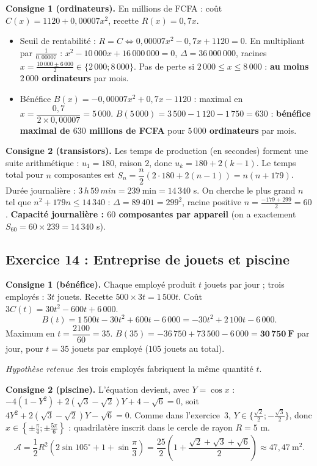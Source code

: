 \documentclass[11pt,a4paper]{article}
\newenvironment{hyp}{\par\medskip\noindent\textit{Hypoth\`ese retenue :}\quad}{\par\medskip}
\begin{document}
\textbf{Consigne 1 (ordinateurs).} En millions de FCFA : co\^ut $C(x)=1120+0{,}00007x^2$, recette $R(x)=0{,}7x$.
\begin{itemize}
  \item Seuil de rentabilit\'e : $R=C\iff0{,}00007x^2-0{,}7x+1120=0$. En multipliant par $\frac{1}{0{,}00007}$ :
  $x^2-10\,000x+16\,000\,000=0$, $\Delta=36\,000\,000$, racines $x=\frac{10\,000\pm6\,000}{2}\in\{2\,000;8\,000\}$.
  Pas de perte si $2\,000\le x\le 8\,000$ : \textbf{au moins $2\,000$ ordinateurs} par mois.
  \item B\'en\'efice $B(x)=-0{,}00007x^2+0{,}7x-1120$ : maximal en $x=\dfrac{0{,}7}{2\times0{,}00007}=5\,000$.
  $B(5\,000)=3\,500-1\,120-1\,750=630$ : \textbf{b\'en\'efice maximal de $630$ millions de FCFA} pour \textbf{$5\,000$ ordinateurs} par mois.
\end{itemize}

\textbf{Consigne 2 (transistors).} Les temps de production (en secondes) forment une suite arithm\'etique :
$u_1=180$, raison $2$, donc $u_k=180+2(k-1)$.
Le temps total pour $n$ composantes est $S_n=\dfrac{n}{2}(2\cdot180+2(n-1))=n(n+179)$.
Dur\'ee journali\`ere : $3\,h\,59\,min=239\ \text{min}=14\,340$ s.
On cherche le plus grand $n$ tel que $n^2+179n\le14\,340$ : $\Delta=89\,401=299^2$, racine positive $n=\frac{-179+299}{2}=60$.
\textbf{Capacit\'e journali\`ere : $60$ composantes par appareil} (on a exactement $S_{60}=60\times239=14\,340$ s).

\subsection{Exercice 14 : Entreprise de jouets et piscine}

\textbf{Consigne 1 (b\'en\'efice).} Chaque employ\'e produit $t$ jouets par jour ; trois employ\'es : $3t$ jouets.
Recette $500\times3t=1\,500t$. Co\^ut $3C(t)=30t^2-600t+6\,000$.
\[
B(t)=1\,500t-30t^2+600t-6\,000=-30t^2+2\,100t-6\,000.
\]
Maximum en $t=\dfrac{2100}{60}=35$. $B(35)=-36\,750+73\,500-6\,000=\mathbf{30\,750\ F}$ par jour,
pour $t=35$ jouets par employ\'e ($105$ jouets au total).
\begin{hyp}les trois employ\'es fabriquent la m\^eme quantit\'e $t$.\end{hyp}

\textbf{Consigne 2 (piscine).} L'\'equation devient, avec $Y=\cos x$ : $-4(1-Y^2)+2(\sqrt3-\sqrt2)Y+4-\sqrt6=0$, soit
$4Y^2+2(\sqrt3-\sqrt2)Y-\sqrt6=0$. Comme dans l'exercice~3, $Y\in\{\frac{\sqrt2}{2};-\frac{\sqrt3}{2}\}$, donc
$x\in\left\{\pm\frac{\pi}{4};\pm\frac{5\pi}{6}\right\}$ : quadrilat\`ere inscrit dans le cercle de rayon $R=5$ m.
\[
\mathcal A=\frac12R^2\left(2\sin105^\circ+1+\sin\frac{\pi}{3}\right)=\frac{25}{2}\left(1+\frac{\sqrt2+\sqrt3+\sqrt6}{2}\right)\approx 47{,}47\ \text{m}^2.
\]
\end{document}
